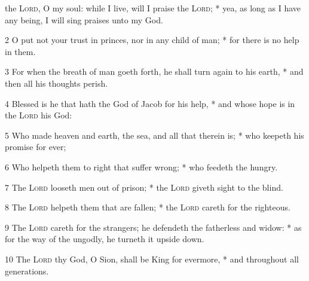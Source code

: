 the {\textsc{Lord}}, O my soul: while I live, will I praise the {\textsc{Lord}}; * yea, as long as I have any being, I will sing praises unto my God.\par
2 O put not your trust in princes, nor in any child of man; * for there is no help in them.\par
3 For when the breath of man goeth forth, he shall turn again to his earth, * and then all his thoughts perish.\par
4 Blessed is he that hath the God of Jacob for his help, * and whose hope is in the {\textsc{Lord}} his God:\par
5 Who made heaven and earth, the sea, and all that therein is; * who keepeth his promise for ever;\par
6 Who helpeth them to right that suffer wrong; * who feedeth the hungry.\par
7 The {\textsc{Lord}} looseth men out of prison; * the {\textsc{Lord}} giveth sight to the blind.\par
8 The {\textsc{Lord}} helpeth them that are fallen; * the {\textsc{Lord}} careth for the righteous.\par
9 The {\textsc{Lord}} careth for the strangers; he defendeth the fatherless and widow: * as for the way of the ungodly, he turneth it upside down.\par
10 The {\textsc{Lord}} thy God, O Sion, shall be King for evermore, * and throughout all generations.
